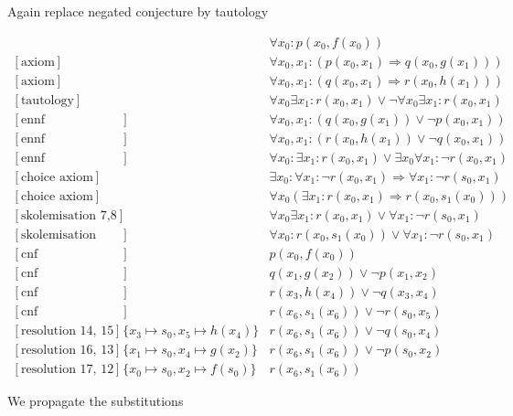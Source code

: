 \documentclass[onehalfspacing]{article}
\begin{document}
Again replace negated conjecture by tautology

\setcounter{equation}{0}
\begin{align}
	[\text{axiom}] && \forall x_0: p(x_0,f(x_0))\\
	[\text{axiom}] && \forall x_0, x_1 : (p(x_0,x_1) \Rightarrow q(x_0,g(x_1)))\\
	[\text{axiom}] && \forall x_0, x_1 : (q(x_0,x_1) \Rightarrow r(x_0,h(x_1)))\\
	[\text{tautology}] &&\forall  x_0 \exists x_1 : r(x_0,x_1)\vee \neg\forall  x_0 \exists x_1 : r(x_0,x_1)\\
	[\text{ennf transformation 2}] && \forall x_0, x_1 : (q(x_0,g(x_1)) \vee \neg p(x_0,x_1)) \\
	[\text{ennf transformation 3}] &&\forall x_0, x_1 : (r(x_0,h(x_1)) \vee \neg q(x_0, x_1)) \\
	[\text{ennf transformation 4}] && \forall  x_0 : \exists x_1 : r(x_0,x_1)\vee \exists x_0 \forall x_1 : \neg r(x_0, x_1)\\
	[\text{choice axiom}] && \exists x_0 : \forall x_1 : \neg r(x_0, x_1) \Rightarrow \forall x_1 : \neg r(s_0,x_1)\\
	[\text{choice axiom}] &&\forall x_0(\exists x_1: r(x_0, x_1)\Rightarrow r(x_0, s_1(x_0)))\\
	[\text{skolemisation 7,8}] && \forall  x_0 \exists x_1 : r(x_0,x_1)\vee \forall x_1 : \neg r(s_0, x_1)\\
	[\text{skolemisation 9,10}] && \forall  x_0 :  r(x_0, s_1(x_0))\vee \forall x_1 : \neg r(s_0, x_1)\\
	[\text{cnf transformation 1}] && p(x_0,f(x_0))\\
	[\text{cnf transformation 5}] && q(x_1,g(x_2)) \vee \neg p(x_1, x_2)\\
	[\text{cnf transformation 6}] && r(x_3,h(x_4)) \vee \neg q(x_3, x_4)\\
	[\text{cnf transformation 11}] && r(x_6, s_1(x_6))\vee\neg r(s_0, x_5)\\
	[\text{resolution 14, 15}] &\{x_3\mapsto s_0, x_5\mapsto h(x_4)\}&r(x_6, s_1(x_6))\vee \neg q(s_0,x_4)\\
	[\text{resolution 16, 13}] &\{x_1\mapsto s_0, x_4\mapsto g(x_2)\}&r(x_6, s_1(x_6))\vee\neg p(s_0,x_2)\\
	[\text{resolution 17, 12}] &\{x_0\mapsto s_0, x_2\mapsto f(s_0)\}&r(x_6, s_1(x_6))
\end{align}

We propagate the substitutions
\end{document}
